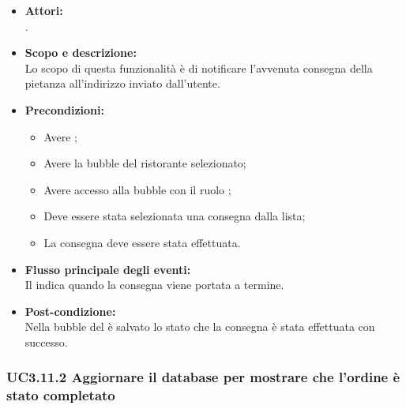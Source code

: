 \begin{itemize}
	\item \textbf{Attori:}
	\\.
	\item \textbf{Scopo e descrizione:} 
	\\Lo scopo di questa funzionalità è di notificare l'avvenuta consegna della pietanza all'indirizzo inviato dall'utente.
	\item \textbf{Precondizioni:}
	\begin{itemize}
		\item Avere ;
		\item Avere la bubble del ristorante selezionato;
		\item Avere accesso alla bubble con il ruolo ;
		\item Deve essere stata selezionata una consegna dalla lista;
		\item La consegna deve essere stata effettuata.
	\end{itemize}
	\item \textbf{Flusso principale degli eventi:}
	\\Il {} indica quando la consegna viene portata a termine.
	\item \textbf{Post-condizione:}
	\\Nella bubble del  è salvato lo stato che la consegna è stata effettuata con successo.
\end{itemize}

\subsubsection{UC3.11.2 Aggiornare il database per mostrare che l’ordine è stato completato} \label{UC3.11.2}

